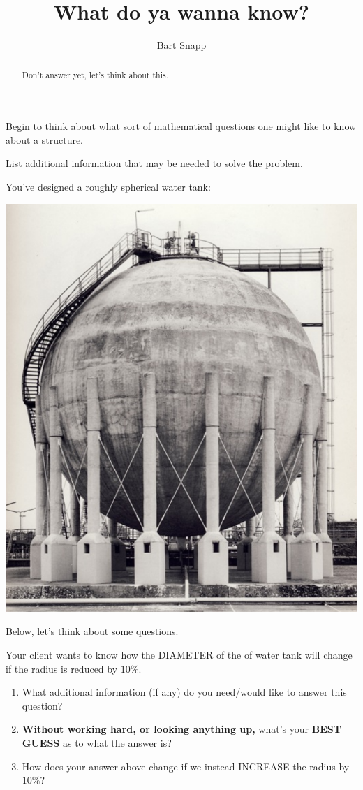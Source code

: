 \documentclass[handout,nooutcomes,noauthor]{ximera}
\title{What do ya wanna know?}
\author{Bart Snapp}
\begin{document}
\begin{abstract}
  Don't answer yet, let's think about this.
\end{abstract}
\maketitle


\begin{listOutcomes}
\item Begin to think about what sort of mathematical questions one
  might like to know about a structure.
\item List additional information that may be needed to solve the
  problem.
\end{listOutcomes}


You've designed a roughly spherical water tank:
\begin{center}%
  \includegraphics[width=.4\textwidth]{tank.png}
\end{center}

Below, let's think about some questions.



\mynewpage



\begin{question} %
  Your client wants to know how the DIAMETER of the of water tank will
  change if the radius is reduced by $10\%$.
  \begin{enumerate}
  \item What additional information (if any) do you need/would like
    to answer this question?
  \item \textbf{Without working hard, or looking anything up,} what's
    your \textbf{BEST GUESS} as to what the answer is?
  \item How does your answer above change if we instead INCREASE the
    radius by $10\%$?
  \end{enumerate}
\end{question}
\end{document}
